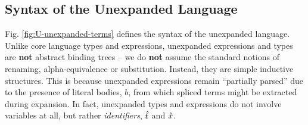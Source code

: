 \documentclass[acmsmall,screen]{acmart}
\begin{document}
\subsection{Syntax of the Unexpanded Language}\label{sec:syntax-U}\label{sec:s-UL}
Fig. \ref{fig:U-unexpanded-terms} defines the syntax of the unexpanded language. Unlike core language types and expressions, unexpanded expressions and types are \textbf{not} abstract binding trees -- we do \textbf{not} assume the standard notions of renaming, alpha-equivalence or substitution. Instead, they are simple inductive  structures. This is because unexpanded expressions remain ``partially parsed'' due to the presence of literal bodies, $b$, from which spliced terms might be extracted during expansion. In fact, unexpanded types and expressions do not involve variables at all, but rather \emph{identifiers}, ${\hat{t}}$ and ${\hat x}$. %

\end{document}
